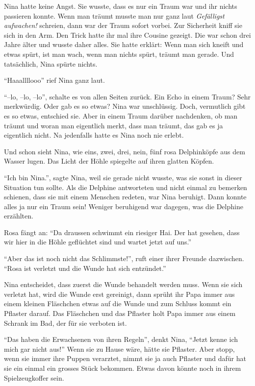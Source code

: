 Nina hatte keine Angst. Sie wusste, dass es nur ein Traum war und ihr nichts passieren konnte. Wenn man träumt musste man nur ganz laut {\it Gefälligst aufwachen!} schreien, dann war der Traum sofort vorbei. Zur Sicherheit kniff sie sich in den Arm. Den Trick hatte ihr mal ihre Cousine gezeigt. Die war schon drei Jahre älter und wusste daher alles. Sie hatte erklärt: Wenn man sich kneift und etwas spürt, ist man wach, wenn man nichts spürt, träumt man gerade. Und tatsächlich, Nina spürte nichts.

\enquote{Haaallllooo} rief Nina ganz laut.

\enquote{--lo, --lo, --lo}, schalte es von allen Seiten zurück. Ein Echo in einem Traum? Sehr merkwürdig. Oder gab es so etwas? Nina war unschlüssig. Doch, vermutlich gibt es so etwas, entschied sie. Aber in einem Traum darüber nachdenken, ob man träumt und woran man eigentlich merkt, dass man träumt, das gab es ja eigentlich nicht. Na jedenfalls hatte es Nina noch nie erlebt.

Und schon sieht Nina, wie eins, zwei, drei, nein, fünf rosa Delphinköpfe aus dem Wasser lugen. Das Licht der Höhle spiegelte auf ihren glatten Köpfen. 

\enquote{Ich bin Nina.}, sagte Nina, weil sie gerade nicht wusste, was sie sonst in dieser Situation tun sollte. Als die Delphine antworteten und nicht einmal zu bemerken schienen, dass sie mit einem Menschen redeten, war Nina beruhigt. Dann konnte alles ja nur ein Traum sein! Weniger beruhigend war dagegen, was die Delphine erzählten.

Rosa fängt an: \enquote{Da draussen schwimmt ein riesiger Hai. Der hat gesehen, dass wir hier in die Höhle geflüchtet sind und wartet jetzt auf uns.}

\enquote{Aber das ist noch nicht das Schlimmste!}, ruft einer ihrer Freunde dazwischen. \enquote{Rosa ist verletzt und die Wunde hat sich entzündet.}

Nina entscheidet, dass zuerst die Wunde behandelt werden muss. Wenn sie sich verletzt hat, wird die Wunde erst gereinigt, dann sprüht ihr Papa immer aus einem kleinen Fläschchen etwas auf die Wunde und zum Schluss kommt ein Pflaster darauf. Das Fläschchen und das Pflaster holt Papa immer aus einem Schrank im Bad, der für sie verboten ist. 

\enquote{Das haben die Erwachsenen von ihren Regeln}, denkt Nina, \enquote{Jetzt kenne ich mich gar nicht aus!} Wenn sie zu Hause wäre, hätte sie Pflaster. Aber stopp, wenn sie immer ihre Puppen verarztet, nimmt sie ja auch Pflaster und dafür hat sie ein einmal ein grosses Stück bekommen. Etwas davon könnte noch in ihrem Spielzeugkoffer sein.

